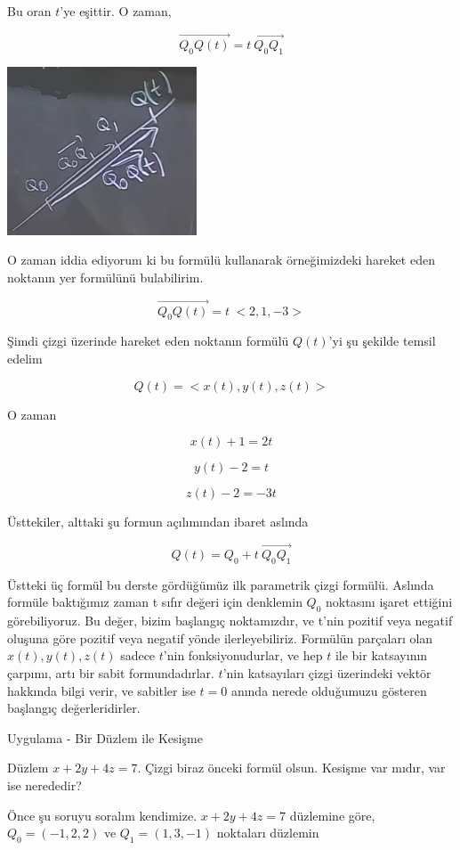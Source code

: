 \documentclass[12pt,fleqn]{article}\usepackage{../../common}
\begin{document}
Bu oran $t$'ye eşittir. O zaman,

$$ \vec{Q_0Q(t)} = t \ \vec{Q_0Q_1}  $$

\begin{center}
\includegraphics[height=5cm]{5_2.png}
\end{center}

O zaman iddia ediyorum ki bu formülü kullanarak örneğimizdeki hareket eden
noktanın yer formülünü bulabilirim.

$$ \vec{Q_0Q(t)} = t \ <2,1,-3>  $$

Şimdi çizgi üzerinde hareket eden noktanın formülü $Q(t)$'yi şu şekilde
temsil edelim

$$ Q(t) = <x(t),y(t),z(t)> $$

O zaman

$$ x(t) + 1 = 2t $$

$$ y(t) - 2 = t $$

$$ z(t) - 2 = -3t $$

Üsttekiler, alttaki şu formun açılımından ibaret aslında

$$ Q(t) = Q_0 + t \ \vec{Q_0Q_1}  $$

Üstteki üç formül bu derste gördüğümüz ilk parametrik çizgi formülü. Aslında
formüle baktığımız zaman t sıfır değeri için denklemin $Q_0$ noktasını işaret
ettiğini görebiliyoruz. Bu değer, bizim başlangıç noktamızdır, ve t'nin pozitif
veya negatif oluşuna göre pozitif veya negatif yönde ilerleyebiliriz.  Formülün
parçaları olan $x(t),y(t),z(t)$ sadece $t$'nin fonksiyonudurlar, ve hep $t$ ile
bir katsayının çarpımı, artı bir sabit formundadırlar. $t$'nin katsayıları çizgi
üzerindeki vektör hakkında bilgi verir, ve sabitler ise $t=0$ anında nerede
olduğumuzu gösteren başlangıç değerleridirler.

Uygulama - Bir Düzlem ile Kesişme

Düzlem $x+2y+4z=7$. Çizgi biraz önceki formül olsun. Kesişme var mıdır, var
ise nerededir? 

Önce şu soruyu soralım kendimize. $x+2y+4z=7$ düzlemine göre, 
$Q_0 =(-1,2,2)$ ve $Q_1 = (1,3,-1)$ noktaları düzlemin
\end{document}
